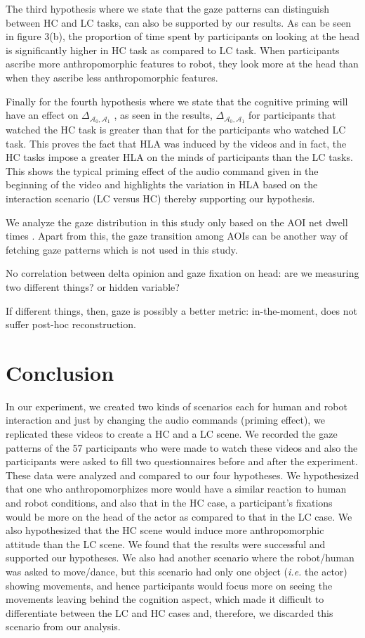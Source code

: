 \documentclass[lettersize, apacite, twoside, HRI]{apa_HRI}
\newcommand{\ie}{\textit{i.e.}\xspace}
\newcommand{\deltaant}{{ $\Delta_{\mathcal{A}_0,\mathcal{A}_1}$ }}
\begin{document}
The third hypothesis where we state that the gaze patterns can distinguish
between HC and LC tasks, can also be supported by our results. As can be seen in
figure 3(b), the proportion of time spent by participants on looking at the head
is significantly higher in HC task as compared to LC task. When participants
ascribe more anthropomorphic features to robot, they look more at the head than
when they ascribe less anthropomorphic features.

Finally for the fourth hypothesis where we state that the cognitive priming will
have an effect on \deltaant, as seen in the results, \deltaant
for participants that watched the HC task is greater than that for the
participants who watched LC task. This proves the fact that HLA was induced by
the videos and in fact, the HC tasks impose a greater HLA on the minds of
participants than the LC tasks. This shows the typical priming effect of the
audio command given in the beginning of the video and highlights the variation
in HLA based on the interaction scenario (LC versus HC) thereby supporting our
hypothesis. 

We analyze the gaze distribution in this study only based on the AOI net dwell
times . Apart from this, the gaze transition among AOIs can be another way of
fetching gaze patterns which is not used in this study.


No correlation between delta opinion and gaze fixation on head: are we measuring
two different things? or hidden variable?

If different things, then, gaze is possibly a better metric: in-the-moment, does
not suffer post-hoc reconstruction.


\section{Conclusion}

In our experiment, we created two kinds of scenarios each for human and
robot interaction and just by changing the audio commands (priming
effect), we replicated these videos to create a HC and a LC scene. We recorded
the gaze patterns of the 57 participants who were made to watch these videos and
also the participants were asked to fill two questionnaires before and after the
experiment. These data were analyzed and compared to our four hypotheses. We
hypothesized that one who anthropomorphizes more would have a similar reaction
to human and robot conditions, and also that in the HC case, a
participant's fixations would be more on the head of the actor as compared to
that in the LC case. We also hypothesized that the HC scene would induce more
anthropomorphic attitude than the LC scene. We found that the results were
successful and supported our hypotheses. We also had another scenario where the
robot/human was asked to move/dance, but this scenario had only one object
(\ie the actor) showing movements, and hence participants would focus
more on seeing the movements leaving behind the cognition aspect, which made it
difficult to differentiate between the LC and HC cases and, therefore, we
discarded this scenario from our analysis.
\end{document}
